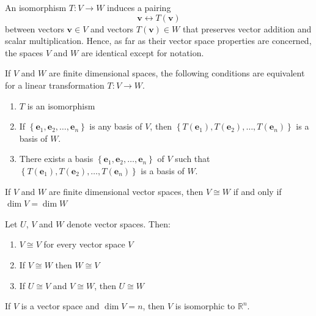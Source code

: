 \documentclass[12pt]{article}
\begin{document}
\begin{note}{}{}
    An isomorphism $ T : V \to W $ induces a pairing
    \[ \mathbf{v} \leftrightarrow T \left( \mathbf{v} \right) \]
    between vectors $ \mathbf{v} \in V $ and vectors $ T \left( \mathbf{v} \right) \in W $ that preserves vector addition and scalar multiplication. Hence, as far as their vector space properties are concerned, the spaces $ V $ and $ W $ are identical except for notation.
\end{note}

\begin{theorem}{}{}
    If $ V $ and $ W $ are finite dimensional spaces, the following conditions are equivalent for a linear transformation $ T : V \to W $.
    \begin{enumerate}[label=(\roman*)]
        \item $ T $ is an isomorphism
        \item If $ \left\{ \mathbf{e}_1, \mathbf{e}_2, \dots, \mathbf{e}_n \right\} $ is any basis of $ V $, then $ \left\{ T \left( \mathbf{e}_1 \right), T \left( \mathbf{e}_2 \right), \dots, T \left( \mathbf{e}_n \right) \right\} $ is a basis of $ W $.
        \item There exists a basis $ \left\{ \mathbf{e}_1, \mathbf{e}_2, \dots, \mathbf{e}_n \right\} $ of $ V $ such that $ \left\{ T \left( \mathbf{e}_1 \right), T \left( \mathbf{e}_2 \right), \dots, T \left( \mathbf{e}_n \right) \right\} $ is a basis of $ W $.
    \end{enumerate}
\end{theorem}

\begin{theorem}{}{}
    If $ V $ and $ W $ are finite dimensional vector spaces, then $ V \cong W $ if and only if $ \dim V = \dim W $
\end{theorem}

\begin{corollary}{}{}
    Let $ U $, $ V $ and $ W $ denote vector spaces. Then:
    \begin{enumerate}[label=(\roman*)]
        \item $ V \cong V $ for every vector space $ V $
        \item If $ V \cong W $ then $ W \cong V $
        \item If $ U \cong V $ and $ V \cong W $, then $ U \cong W $
    \end{enumerate}
\end{corollary}

\begin{corollary}{}{}
    If $ V $ is a vector space and $ \dim V = n $, then $ V $ is isomorphic to $ \mathbb{R}^n $. 
\end{corollary}
\end{document}
